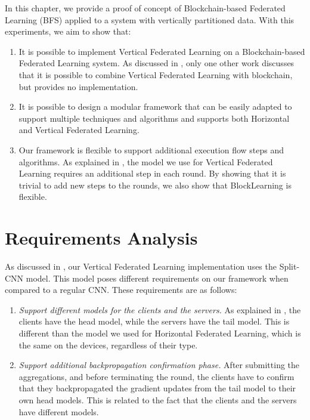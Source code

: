 In this chapter, we provide a proof of concept of Blockchain-based Federated Learning (BFS) applied to a system with vertically partitioned data. With this experiments, we aim to show that:

\begin{enumerate}
    \item It is possible to implement Vertical Federated Learning on a Blockchain-based Federated Learning system. As discussed in , only one other work \cite{10.48550/arxiv.1912.04859} discusses that it is possible to combine Vertical Federated Learning with blockchain, but provides no implementation.

    \item It is possible to design a modular framework that can be easily adapted to support multiple techniques and algorithms and supports both Horizontal and Vertical Federated Learning.
    
    \item Our framework is flexible to support additional execution flow steps and algorithms. As explained in , the model we use for Vertical Federated Learning requires an additional step in each round. By showing that it is trivial to add new steps to the rounds, we also show that BlockLearning is flexible.
\end{enumerate}

\section{Requirements Analysis}

As discussed in , our Vertical Federated Learning implementation uses the Split-CNN model. This model poses different requirements on our framework when compared to a regular CNN. These requirements are as follows:

\begin{enumerate}
    \item \textit{Support different models for the clients and the servers.} As explained in , the clients have the head model, while the servers have the tail model. This is different than the model we used for Horizontal Federated Learning, which is the same on the devices, regardless of their type.
    
    \item \textit{Support additional backpropagation confirmation phase.} After submitting the aggregations, and before terminating the round, the clients have to confirm that they backpropagated the gradient updates from the tail model to their own head models. This is related to the fact that the clients and the servers have different models.
\end{enumerate}

